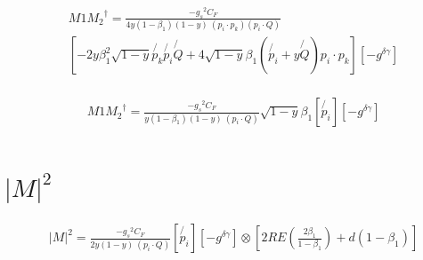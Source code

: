 \begin{equation}
\begin{split}
&M1{M_2}^{\dagger}=\frac{-{g_s}^2 C_F}{4 y(1-\beta_1) (1-y)\:(p_i \cdot p_k)(p_i \cdot Q)}\\
&[-2y\beta_1^2\sqrt{1-y} \not{p_k}\not{p_i}\not{Q}+4\sqrt{1-y}\beta_1(\not{p_i}+y\not{Q})p_i\cdot p_k][-g^{\delta{{\gamma}}}]\\
\end{split}
\end{equation}

\begin{equation}
\begin{split}
&M1{M_2}^{\dagger}=\frac{-{g_s}^2 C_F}{y(1-\beta_1) (1-y)\:(p_i \cdot Q)}\sqrt{1-y}\beta_1[\not{p_i}][-g^{\delta{{\gamma}}}]\\
\end{split}
\end{equation}

\section{$ |M|^{2} $}

\begin{equation}
\begin{split}
&|M|^{2}=\frac{-{g_s}^2 C_F}{2y (1-y)\:(p_i \cdot Q)}[\not{p_i}][-g^{\delta{{\gamma}}}]\otimes [2RE(\frac{2\beta_1}{1-\beta_1})+d(1-\beta_1)]\\
\end{split}
\end{equation}


















